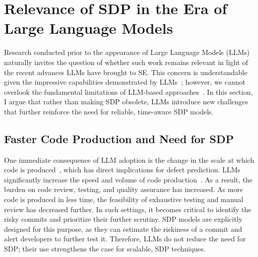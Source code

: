 \documentclass[\main/thesis.tex]{subfiles}
\begin{document}

 
\section{Relevance of SDP in the Era of Large Language Models}
Research conducted prior to the appearance of Large Language Models (LLMs) naturally invites the question of whether such work remains relevant in light of the recent advances LLMs have brought to SE. This concern is understandable given the impressive capabilities demonstrated by LLMs~\cite{hou2024large}; however, we cannot overlook the fundamental limitations of LLM-based approaches~\cite{sallou2024breaking,ouyang2025empirical,perkovic2024hallucinations}. In this section, I argue that rather than making SDP obsolete, LLMs introduce new challenges that further reinforce the need for reliable, time-aware SDP models.

\subsection{Faster Code Production and Need for SDP}
One immediate consequence of LLM adoption is the change in the scale at which code is produced~\cite{kumar2025intuition,cui2025effects}, which has direct implications for defect prediction.
LLMs significantly increase the speed and volume of code production~\cite{kumar2025intuition,cui2025effects}. 
As a result, the burden on code review, testing, and quality assurance has increased. As more code is produced in less time, the feasibility of exhaustive testing and manual review has decreased further. In such settings, it becomes critical to identify the risky commits and prioritize their further scrutiny. SDP models are explicitly designed for this purpose, as they can estimate the riskiness of a commit and alert developers to further test it. Therefore, LLMs do not reduce the need for SDP; their use strengthens the case for scalable, SDP techniques.
\end{document}
